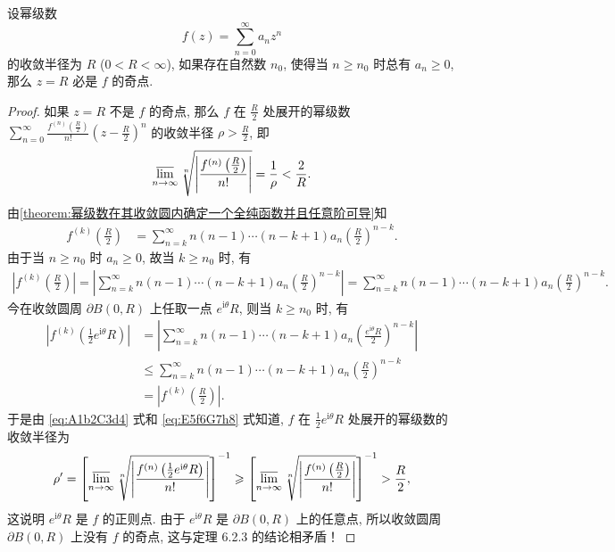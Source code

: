 \documentclass[../../main.tex]{subfiles}%
\begin{document}
\begin{proposition}\label{proposition:幂级数收敛圆上必有奇点}
设幂级数
\[
f(z) = \sum_{n=0}^{\infty} a_n z^n
\]
的收敛半径为 \(R\) (\(0<R<\infty\)), 如果存在自然数 \(n_0\), 使得当 \(n \geqslant n_0\) 时总有 \(a_n \geqslant 0\), 那么 \(z=R\) 必是 \(f\) 的奇点.
\end{proposition}
\begin{proof}
如果 \(z=R\) 不是 \(f\) 的奇点, 那么 \(f\) 在 \(\frac{R}{2}\) 处展开的幂级数
\(\sum_{n=0}^{\infty} \frac{f^{(n)}\left( \frac{R}{2} \right)}{n!} \left( z-\frac{R}{2} \right)^n\) 的收敛半径 \(\rho > \frac{R}{2}\), 即
\begin{align}
\varlimsup\limits_{n \to \infty} \sqrt[n]{\left| \frac{f^{(n)}\left( \frac{R}{2} \right)}{n!} \right|} = \frac{1}{\rho} < \frac{2}{R}. \label{eq:A1b2C3d4}
\end{align}
由\cref{theorem:幂级数在其收敛圆内确定一个全纯函数并且任意阶可导}知
\begin{align*}
f^{(k)}\left( \frac{R}{2} \right) &= \sum_{n=k}^{\infty} n(n-1)\cdots(n-k+1)a_n \left( \frac{R}{2} \right)^{n-k}.
\end{align*}
由于当 \(n \geqslant n_0\) 时 \(a_n \geqslant 0\), 故当 \(k \geqslant n_0\) 时, 有
\begin{align*}
\left| f^{(k)}\left( \frac{R}{2} \right) \right| = \left| \sum_{n=k}^{\infty} n(n-1)\cdots(n-k+1)a_n \left( \frac{R}{2} \right)^{n-k} \right| 
= \sum_{n=k}^{\infty} n(n-1)\cdots(n-k+1)a_n \left( \frac{R}{2} \right)^{n-k}.
\end{align*}
今在收敛圆周 \(\partial B(0,R)\) 上任取一点 \(e^{\mathrm{i}\theta}R\), 则当 \(k \geqslant n_0\) 时, 有
\begin{align}
\left| f^{(k)}\left( \frac{1}{2} e^{\mathrm{i}\theta}R \right) \right| &= \left| \sum_{n=k}^{\infty} n(n-1)\cdots(n-k+1)a_n \left( \frac{e^{\mathrm{i}\theta}R}{2} \right)^{n-k} \right| \nonumber \\
&\leqslant \sum_{n=k}^{\infty} n(n-1)\cdots(n-k+1)a_n \left( \frac{R}{2} \right)^{n-k} \nonumber \\
&= \left| f^{(k)}\left( \frac{R}{2} \right) \right|. \label{eq:E5f6G7h8}
\end{align}
于是由 \eqref{eq:A1b2C3d4} 式和 \eqref{eq:E5f6G7h8} 式知道, \(f\) 在 \(\frac{1}{2} e^{\mathrm{i}\theta}R\) 处展开的幂级数的收敛半径为
\begin{align*}
\rho' = \left[ \varlimsup\limits_{n \to \infty} \sqrt[n]{\left| \frac{f^{(n)}\left( \frac{1}{2} e^{\mathrm{i}\theta}R \right)}{n!} \right|} \right]^{-1} \geqslant \left[ \varlimsup\limits_{n \to \infty} \sqrt[n]{\left| \frac{f^{(n)}\left( \frac{R}{2} \right)}{n!} \right|} \right]^{-1} > \frac{R}{2},
\end{align*}
这说明 \(e^{\mathrm{i}\theta}R\) 是 \(f\) 的正则点. 由于 \(e^{\mathrm{i}\theta}R\) 是 \(\partial B(0,R)\) 上的任意点, 所以收敛圆周 \(\partial B(0,R)\) 上没有 \(f\) 的奇点, 这与定理 6.2.3 的结论相矛盾！\end{proof}
\end{document}
